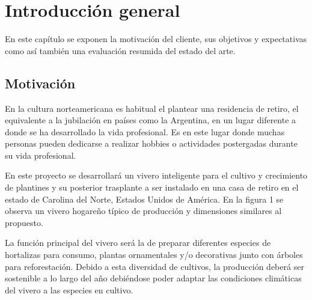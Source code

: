 
\chapter{Introducción general} %

\label{Chapter1} %
\label{IntroGeneral}


\newcommand{\keyword}[1]{\textbf{#1}}
\newcommand{\tabhead}[1]{\textbf{#1}}
\newcommand{\code}[1]{\texttt{#1}}
\newcommand{\file}[1]{\texttt{\bfseries#1}}
\newcommand{\option}[1]{\texttt{\itshape#1}}
\newcommand{\grados}{$^{\circ}$}


En este capítulo se exponen la motivación del cliente, sus objetivos y expectativas como así también una evaluación resumida del estado del arte.
\section{Motivación}
\label{Motivación}

En la cultura norteamericana es habitual el plantear una residencia de retiro, el equivalente a la jubilación en países como la Argentina, en un lugar diferente a donde se ha desarrollado la vida profesional.
Es en este lugar donde muchas personas pueden dedicarse a realizar hobbies o actividades postergadas durante su vida profesional.

En este proyecto se desarrollará un vivero inteligente para el cultivo y crecimiento de plantines y su posterior trasplante a ser instalado en una casa de retiro en el estado de Carolina del Norte, Estados Unidos de América. 
En la figura 1 se observa un vivero hogareño típico de producción y dimensiones similares al propuesto.


La función principal del vivero será la de preparar diferentes especies de hortalizas para consumo, plantas ornamentales y/o decorativas junto con árboles para reforestación. Debido a esta diversidad de cultivos, la producción deberá ser sostenible a lo largo del año debiéndose poder adaptar las condiciones climáticas del vivero a las especies en cultivo. 

